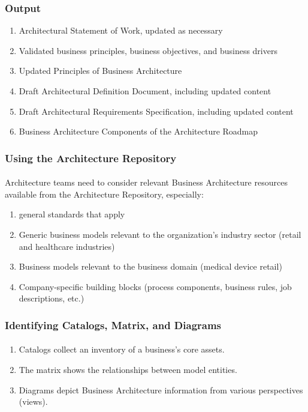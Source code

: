 \documentclass[aspectratio=169, table]{beamer}
\begin{document}
    \begin{frame}
        \frametitle{Output}
        \begin{enumerate}
            \item Architectural Statement of Work, updated as necessary
            \item Validated business principles, business objectives, and business drivers
            \item Updated Principles of Business Architecture
            \item Draft Architectural Definition Document, including updated content
            \item Draft Architectural Requirements Specification, including updated content
            \item Business Architecture Components of the Architecture Roadmap
        \end{enumerate}
    \end{frame}

    \begin{frame}
        \frametitle{Using the Architecture Repository}
        \framesubtitle{\hspace{1cm}}
        Architecture teams need to consider relevant Business Architecture resources available from the Architecture Repository, especially:
        \begin{enumerate}
            \item general standards that apply
            \item Generic business models relevant to the organization's industry sector (retail and healthcare industries)
            \item Business models relevant to the business domain (medical device retail)
            \item Company-specific building blocks (process components, business rules, job descriptions, etc.)

        \end{enumerate}
    \end{frame}


    \begin{frame}
        \frametitle{Identifying Catalogs, Matrix, and Diagrams}
        \framesubtitle{\hspace{1cm}}
        \begin{enumerate}
            \item Catalogs collect an inventory of a business's core assets.
            \item The matrix shows the relationships between model entities.
            \item Diagrams depict Business Architecture information from various perspectives (views).
        \end{enumerate}
    \end{frame}
\end{document}
